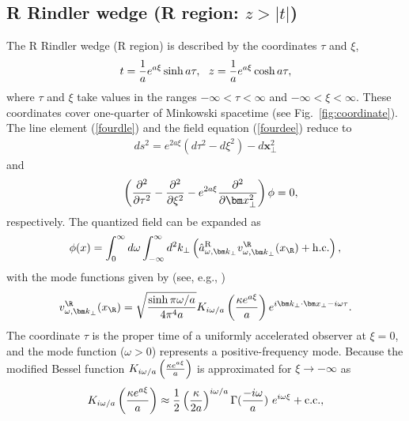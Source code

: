 \documentclass[aps,prd,preprintnumbers,nofootinbib,showpacs]{revtex4}%
\begin{document}
\begin{widetext}
\subsection{R Rindler wedge (R region: $z>|t|$)}
The R Rindler wedge (R region) is described by the coordinates $\tau$ and $\xi$, 
\begin{eqnarray}
t={1\over a}e^{a\xi}\sinh a\tau,~~
z={1\over a}e^{a\xi}\cosh a\tau,
\end{eqnarray}
where $\tau$ and $\xi$ take values in the ranges $-\infty<\tau <\infty$ and $-\infty<\xi<\infty$.
These coordinates cover one-quarter of Minkowski spacetime (see Fig.~\ref{fig:coordinate}). 
The line element (\ref{fourdle}) and the field equation (\ref{fourdee}) reduce to
\begin{eqnarray}
ds^2=e^{2a\xi}(d\tau^2-d\xi^2)-d\bm x_\perp^2
\end{eqnarray}
and 
\begin{eqnarray}
&&\left({\partial^2\over \partial \tau^2}-{\partial^2\over \partial \xi^2}
-e^{2a\xi}{\partial^2\over \partial \bm x_\perp^2}\right)\phi=0,
\label{fourdeeR}
\end{eqnarray}
respectively. The quantized field can be expanded as
\begin{eqnarray}
\phi(x)=\int_{0}^{\infty} d \omega\int_{-\infty}^{\infty} d^2 k_\perp \left( {\hat a}_{\omega,{\bm k}_\perp}^{\rm R} v_{\omega,{\bm k}_\perp}^\R(x_\R)
+{\rm h.c.}
\right),
\label{qfR}
\end{eqnarray}
with the mode functions given by (see, e.g., \cite{Higuchi})
\begin{eqnarray}
v_{\omega,{\bm k}_\perp}^\R(x_\R)=\sqrt{\sinh \pi \omega/a\over 4\pi^4 a}
K_{i\omega/a}\left({\kappa e^{a\xi}\over a}\right)e^{i\bm k_\perp\cdot \bm x_\perp-i\omega\tau}.
\label{mfR}
\end{eqnarray}
The coordinate $\tau$ is the proper time of a uniformly accelerated observer at $\xi=0$,
and the mode function ($\omega>0$) represents a positive-frequency mode. 
Because the modified Bessel function 
$K_{i\omega/a}\left({\kappa e^{a\xi}\over a}\right)$ is approximated for 
 $\xi \rightarrow - \infty$ as 
\begin{eqnarray}
K_{i\omega/a}\left({\kappa e^{a\xi}\over a}\right) \approx
\frac{1}{2}\left( \frac{\kappa}{2a} \right)^{i \omega/a} \Gamma(\frac{-i\omega}{a}) \ e^{i \omega \xi} + {\rm c.c.},
\end{eqnarray}

\end{widetext}
\end{document}
